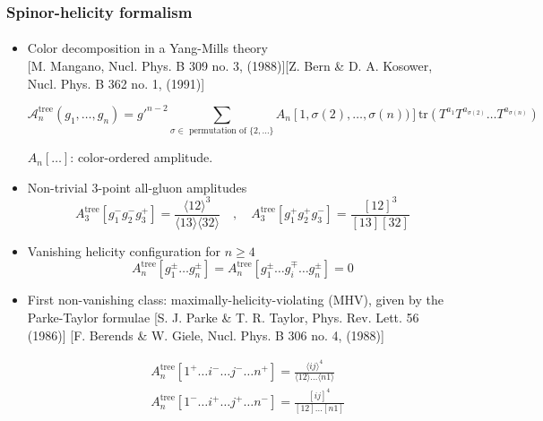 \documentclass[english]{beamer}
\newcommand{\tr}{\mathrm{tr}}
\begin{document}
\begin{frame}[shrink=30]
\frametitle{Spinor-helicity formalism}
\framesubtitle{}
\begin{itemize}
\item<1-> Color decomposition in a Yang-Mills theory
\\
\tiny\color{blue}[M. Mangano, Nucl. Phys. B 309
no. 3, (1988)][Z. Bern \& D. A. Kosower, Nucl. Phys. B 362 no. 1, (1991)]\color{black}\normalsize

\small
\begin{equation*}
\mathcal{A}_n^{\mathrm{tree}}(g_1, \ldots, g_n) = g'^{n-2}\sum_{\sigma\in\textrm{ permutation of }\{2,\ldots\}} A_n[1,\sigma(2),\ldots,\sigma(n))]\tr(T^{a_1} T^{a_{\sigma(2)}}\ldots T^{a_{\sigma(n)}})
\end{equation*}
\normalsize

$A_n[\ldots]$: color-ordered amplitude. 

\item<2-> Non-trivial 3-point all-gluon amplitudes
\begin{equation*}
A^{\mathrm{tree}}_3[g_1^- g_2^- g_3^+] = \frac{\langle 12 \rangle^3}{\langle 13 \rangle \langle 32 \rangle}
\quad,\quad
 A^{\mathrm{tree}}_3[g_1^+ g_2^+ g_3^-] = \frac{ [12]^3}{[13 ][ 32 ]}
\end{equation*}

\item<3-> Vanishing helicity configuration for $n\geq 4$
\begin{equation*}
A^{\mathrm{tree}}_n[g_1^\pm \ldots g_n^\pm] = A^{\mathrm{tree}}_n[g_1^\pm \ldots g_i^\mp \ldots g_n^\pm] = 0
\end{equation*}

\item<4-> First non-vanishing class: maximally-helicity-violating (MHV), given by the Parke-Taylor formulae
\tiny\color{blue}[S. J. Parke \& T. R. Taylor, Phys. Rev. Lett.
56 (1986)]
[F. Berends \& W. Giele, Nucl. Phys. B 306 no. 4, (1988)]
\color{black}\normalsize


\begin{equation*}
\begin{split}
& A^{\mathrm{tree}}_n[1^+\ldots i^-\ldots j^-\ldots n^+] = 
\frac{\langle ij \rangle^4}{\langle 12 \rangle\ldots \langle n1 \rangle}
\\
& A^{\mathrm{tree}}_n[1^-\ldots i^+\ldots j^+\ldots n^-] = 
\frac{[ ij]^4}{[ 12 ]\ldots [n1 ]}
\end{split}
\end{equation*}


\end{itemize}
\end{frame}
\end{document}
